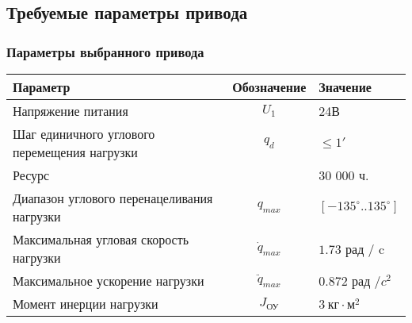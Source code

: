 \subsection{Требуемые параметры привода}



\subsubsection{Параметры выбранного привода}

\begin{tabular}{|l|c|l|}
    \hline
    Параметр                                    & Обозначение      & Значение                   \\
    \hline
    Напряжение питания                          & $U_1$            & 24В                        \\
    Шаг единичного углового перемещения нагрузки& $q_d$            & $ \le 1' $                 \\
    Ресурс                                      &                  & 30 000 ч.                  \\
    Диапазон углового перенацеливания нагрузки  & $q_{max}$        & $[-135^\circ .. 135^\circ] $ \\
    Максимальная угловая скорость нагрузки      & $\dot{q}_{max}$  & $1.73$ рад / c             \\
    Максимальное ускорение нагрузки             & $\ddot{q}_{max}$ & $0.872$ рад /$c^2$         \\
    Момент инерции нагрузки                     & $J_{\text{ОУ}}$  & $3 ~\text{кг} \cdot \text{м}^2 $          \\
    \hline
\end{tabular}

\endinput

